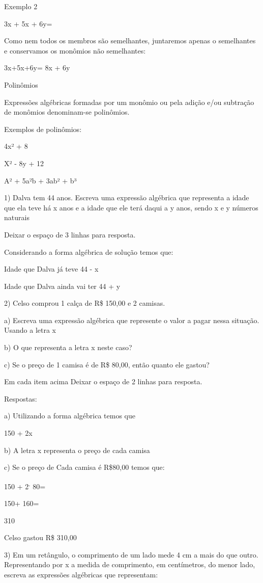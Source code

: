 Exemplo 2

3x + 5x + 6y=

Como nem todos os membros são semelhantes, juntaremos apenas o
semelhantes e conservamos os monômios não semelhantes:

3x+5x+6y= 8x + 6y

Polinômios

Expressões algébricas formadas por um monômio ou pela adição e/ou
subtração de monômios denominam-se polinômios.

Exemplos de polinômios:

4x² + 8

X² - 8y + 12

A² + 5a²b + 3ab² + b³


1) Dalva tem 44 anos. Escreva uma expressão algébrica que representa a
idade que ela teve há x anos e a idade que ele terá daqui a y anos,
sendo x e y números naturais

Deixar o espaço de 3 linhas para resposta.

Considerando a forma algébrica de solução temos que:

Idade que Dalva já teve 44 - x

Idade que Dalva ainda vai ter 44 + y

2) Celso comprou 1 calça de R\$ 150,00 e 2 camisas.

a) Escreva uma expressão algébrica que represente o valor a pagar nessa
situação. Usando a letra x

b) O que representa a letra x neste caso?

c) Se o preço de 1 camisa é de R\$ 80,00, então quanto ele gastou?

Em cada item acima Deixar o espaço de 2 linhas para resposta.

Respostas:

a) Utilizando a forma algébrica temos que

150 + 2x

b) A letra x representa o preço de cada camisa

c) Se o preço de Cada camisa é R\$80,00 temos que:

150 + 2\textsuperscript{.} 80=

150+ 160=

310

Celso gastou R\$ 310,00

3) Em um retângulo, o comprimento de um lado mede 4 cm a mais do que
outro. Representando por x a medida de comprimento, em centímetros, do
menor lado, escreva as expressões algébricas que representam:

